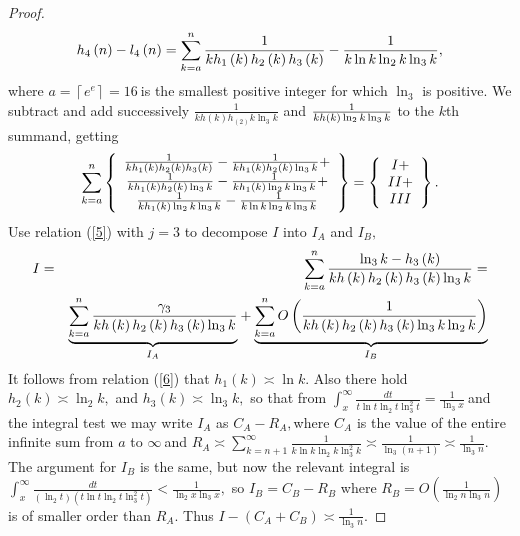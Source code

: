 \documentclass{article}
\theoremstyle{theorem}
\theoremstyle{definition}
\begin{document}
\begin{proof}
\begin{equation*}
h_{4}\left( n\right) -l_{4}\left( n\right) =\sum_{k=a}^{n}\frac{1}{%
kh_{1}\left( k\right) h_{2}\left( k\right) h_{3}\left( k\right) }-\frac{1}{%
k\ln k\ln _{2}k\ln _{3}k},
\end{equation*}%
where $a=\left\lceil e^{e}\right\rceil =16\ $is the smallest positive
integer for which $\ln _{3}$ is positive. We subtract and add successively $%
\frac{1}{kh\left( k\right) h_{\left( 2\right) }k\ln _{3}k}$ and $\frac{1}{%
kh\left( k\right) \ln _{2}k\ln _{3}k}$ to the $k$th summand, getting%
\begin{equation*}
\sum_{k=a}^{n}\left\{ 
\begin{array}{c}
\frac{1}{kh_{1}\left( k\right) h_{2}\left( k\right) h_{3}\left( k\right) }-%
\frac{1}{kh_{1}\left( k\right) h_{2}\left( k\right) \ln _{3}k}+ \\ 
\frac{1}{kh_{1}\left( k\right) h_{2}\left( k\right) \ln _{3}k}-\frac{1}{%
kh_{1}\left( k\right) \ln _{2}k\ln _{3}k}+ \\ 
\frac{1}{kh_{1}\left( k\right) \ln _{2}k\ln _{3}k}-\frac{1}{k\ln k\ln
_{2}k\ln _{3}k}%
\end{array}%
\right\} =\left\{ 
\begin{array}{c}
I+ \\ 
II+ \\ 
III%
\end{array}%
\right\} .
\end{equation*}%
Use relation (\ref{5}) with $j=3$ to decompose $I$ into $I_{A}$ and $I_{B},$%
\begin{eqnarray*}
I &=&\sum_{k=a}^{n}\frac{\ln _{3}k-h_{3}\left( k\right) }{kh\left( k\right)
h_{2}\left( k\right) h_{3}\left( k\right) \ln _{3}k}= \\
&&\underset{I_{A}}{\underbrace{\sum_{k=a}^{n}\frac{\gamma _{3}}{kh\left(
k\right) h_{2}\left( k\right) h_{3}\left( k\right) \ln _{3}k}}}+\underset{%
I_{B}}{\underbrace{\sum_{k=a}^{n}O\left( \frac{1}{kh\left( k\right)
h_{2}\left( k\right) h_{3}\left( k\right) \ln _{3}k\ln _{2}k}\right) }}
\end{eqnarray*}%
It follows from relation (\ref{6}) that $h_{1}\left( k\right) \asymp \ln k.$
Also there hold $h_{2}\left( k\right) \asymp \ln _{2}k,$ and $h_{3}\left(
k\right) \asymp \ln _{3}k,$ so that from $\int_{x}^{\infty }\frac{dt}{t\ln
t\ln _{2}t\ln _{3}^{2}t}=\frac{1}{\ln _{3}x}\ $and the integral test we may
write $I_{A}$ as $C_{A}-R_{A},$where $C_{A}$ is the value of the entire
infinite sum from $a$ to $\infty \ $and $R_{A}\asymp \sum_{k=n+1}^{\infty }%
\frac{1}{k\ln k\ln _{2}k\ln _{3}^{2}k}\asymp \frac{1}{\ln _{3}\left(
n+1\right) }\asymp \frac{1}{\ln _{3}n}.$ The argument for $I_{B}$ is the
same, but now the relevant integral is $\int_{x}^{\infty }\frac{dt}{\left(
\ln _{2}t\right) \left( t\ln t\ln _{2}t\ln _{3}^{2}t\right) }<\frac{1}{\ln
_{2}x\ln _{3}x},$ so $I_{B}=C_{B}-R_{B}$ where $R_{B}=O\left( \frac{1}{\ln
_{2}n\ln _{3}n}\right) $ is of smaller order than $R_{A}.$ Thus $%
I-(C_{A}+C_{B})\asymp \frac{1}{\ln _{3}n}.$


\end{proof}
\end{document}
